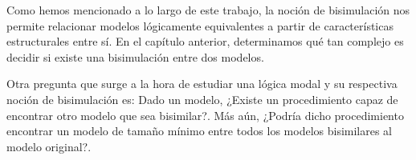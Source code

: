 

    


        


    



Como hemos mencionado a lo largo de este trabajo, la noción de bisimulación nos permite relacionar modelos lógicamente equivalentes a partir de 
características estructurales entre sí. En el capítulo anterior, determinamos qué tan complejo es decidir si existe una bisimulación entre dos 
modelos.

Otra pregunta que surge a la hora de estudiar una lógica modal y su respectiva noción de bisimulación es:
Dado un modelo, ¿Existe un procedimiento capaz de encontrar otro modelo que sea bisimilar?. Más aún, ¿Podría dicho procedimiento encontrar 
un modelo de tamaño mínimo entre todos los modelos bisimilares al modelo original?.

